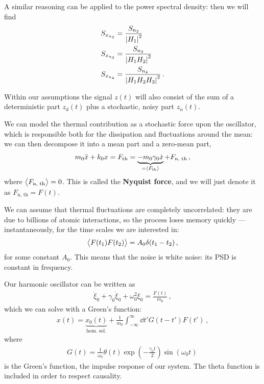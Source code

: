 \documentclass[main.tex]{subfiles}
\begin{document}
A similar reasoning can be applied to the power spectral density: then we will find 
%
\begin{align}
S_{x_{n_2}} &= \frac{S_{n_2}}{\abs{H_1}^2} \\
S_{x_{n_3}} &= \frac{S_{n_3}}{\abs{H_1 H_2 }^2} \\
S_{x_{n_4}} &= \frac{S_{n_4}}{\abs{H_1 H_2 H_3 }^2} 
\,.
\end{align}

Within our assumptions the signal \(z(t)\) will also consist of the sum of  a deterministic part \(z_d(t)\) plus a stochastic, noisy part \(z_n(t)\).

We can model the thermal contribution as a stochastic force upon the oscillator, which is responsible both for the dissipation and fluctuations around the mean: we can then decompose it into a mean part and a zero-mean part,
%
\begin{align}
m_0 \ddot{x} + k_0 x = F _{\text{th}} = \underbrace{- m_0 \gamma_0 \dot{x}}_{= \expval{F _{\text{th}}}} + F _{\text{n, th}} 
\,,
\end{align}
%
where \(\expval{F _{\text{n, th}}} = 0\). This is called the \textbf{Nyquist force}, and we will just denote it as \(F _{\text{n, th}} = F(t)\). 

We can assume that thermal fluctuations are completely uncorrelated: they are due to billions of atomic interactions, so the process loses memory quickly --- instantaneously, for the time scales we are interested in: 
%
\begin{align}
\expval{F(t_1 ) F(t_2 )} = A_0 \delta (t_1 - t_2 )
\,,
\end{align}
%
for some constant \(A_0 \). 
This means that the noise is white noise: its PSD is constant in frequency.

Our harmonic oscillator can be written as 
%
\begin{align}
\ddot{\xi}_{0} + \gamma_0 \dot{\xi}_{0} + \omega_0^2 \xi_0 = \frac{F(t)}{m_0 }
\,,
\end{align}
%
which we can solve with a Green's function: 
%
\begin{align}
x(t) = \underbrace{x_0 (t)}_{\text{hom.\ sol.}}
+ \frac{1}{m_0 } \int_{-\infty }^{\infty } \dd{t'} G(t - t') F(t')  
\,,
\end{align}
%
where 
%
\begin{align}
G(t) = \frac{1}{\omega_0} \theta (t) \exp(- \frac{\gamma_0t}{2}) \sin(\omega_0  t)
\,
\end{align}
%
is the Green's function, the impulse response of our system. The theta function is included in order to respect causality.
\end{document}
